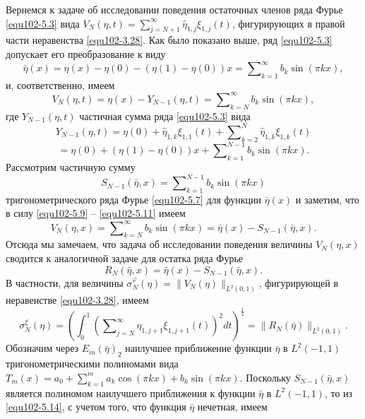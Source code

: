 Вернемся к задаче об исследовании поведения остаточных членов ряда Фурье \eqref{equ102-5.3}  вида $V_N(\eta,t)=\sum\nolimits_{j=N+1}^\infty \hat \eta_{1,j}\xi_{1,j}(t)$, фигурирующих в правой части неравенства \eqref{equ102-3.28}. Как было показано выше, ряд \eqref{equ102-5.3} допускает его преобразование к виду
\begin{equation}\label{equ102-5.7}
\bar\eta(x)=\eta(x)-\eta(0)-(\eta(1)-\eta(0))x= \sum\nolimits_{k=1}^\infty b_k\sin(\pi kx),
\end{equation}
и, соответственно, имеем
\begin{equation}\label{equ102-5.9}
V_N(\eta,t)=\eta(x)-Y_{N-1}(\eta,t)= \sum\nolimits_{k=N}^\infty b_k\sin(\pi kx),
\end{equation}
где  $Y_{N-1}(\eta,t)$ частичная сумма ряда \eqref{equ102-5.3} вида
$$
Y_{N-1}(\eta,t)= \eta(0)+\hat\eta_{1,k}\xi_{1,1}(t)+ \sum\nolimits_{k=2}^N \hat \eta_{1,k}\xi_{1,k}(t)
$$
\begin{equation}\label{equ102-5.10}
= \eta(0)+(\eta(1)-\eta(0))x+\sum\nolimits_{k=1}^{N-1} b_k\sin(\pi kx).
\end{equation}
Рассмотрим частичную сумму
\begin{equation}\label{equ102-5.11}
S_{N-1}(\bar\eta,x)= \sum\nolimits_{k=1}^{N-1} b_k\sin(\pi kx)
\end{equation}
тригонометрического ряда Фурье \eqref{equ102-5.7} для функции $\bar\eta(x)$ и заметим, что в силу \eqref{equ102-5.9} -- \eqref{equ102-5.11} имеем
\begin{equation}\label{equ102-5.12}
V_N(\eta,x)= \sum\nolimits_{k=N}^{\infty} b_k\sin(\pi kx)=\bar\eta(x)-S_{N-1}(\bar\eta,x).
\end{equation}
Отсюда мы замечаем, что задача об исследовании поведения величины $V_N(\eta,x)$ сводится к аналогичной задаче для остатка ряда Фурье
\begin{equation}\label{equ102-5.13}
R_N(\bar\eta,x)= \bar\eta(x)-S_{N-1}(\bar\eta,x).
\end{equation}
В частности, для величины $\sigma_N^\varphi(\eta)=\|V_N(\eta)\|_{L^2(0,1)}$, фигурирующей в неравенстве \eqref{equ102-3.28}, имеем
\begin{equation}\label{equ102-5.14}
\sigma_N^\xi(\eta)=\left(\int_{0}^1\left(\sum\nolimits_{j=N}^\infty \hat \eta_{1,j+1}\xi_{1,j+1}(t)\right)^2 dt\right)^\frac12=\|R_N(\bar\eta)\|_{L^2(0,1)}.
\end{equation}
Обозначим через $E_m(\bar\eta)_2$ наилучшее приближение функции $\bar\eta$ в $L^2(-1,1)$ тригонометрическими полиномами вида $T_m(x)=a_0+\sum_{k=1}^{m}a_k\cos(\pi kx)+b_k\sin(\pi kx)$. Поскольку $S_{N-1}(\bar\eta,x)$ является полиномом наилучшего приближения к функции $\bar\eta$ в $L^2(-1,1)$, то из \eqref{equ102-5.14}, с учетом того, что функция $\bar\eta$ нечетная, имеем
